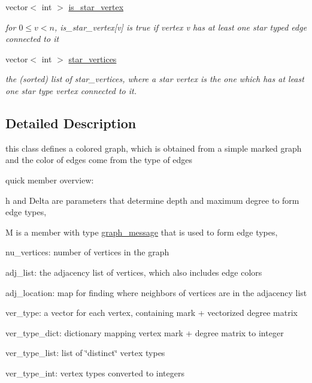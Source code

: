\begin{DoxyCompactItemize}
vector$<$ int $>$ \hyperlink{classcolored__graph_a00d0c64fcf8de58553aa4cade64193df}{is\+\_\+star\+\_\+vertex}
\begin{DoxyCompactList}\small\item\em for $0 \leq v < n$, is\+\_\+star\+\_\+vertex\mbox{[}v\mbox{]} is true if vertex v has at least one star typed edge connected to it \end{DoxyCompactList}\item 
vector$<$ int $>$ \hyperlink{classcolored__graph_ab7ee8d717abde7ad7467ef695038f574}{star\+\_\+vertices}
\begin{DoxyCompactList}\small\item\em the (sorted) list of star\+\_\+vertices, where a star vertex is the one which has at least one star type vertex connected to it. \end{DoxyCompactList}\end{DoxyCompactItemize}


\subsection{Detailed Description}
this class defines a colored graph, which is obtained from a simple marked graph and the color of edges come from the type of edges 

quick member overview\+:


\begin{DoxyItemize}
\item h and Delta are parameters that determine depth and maximum degree to form edge types,
\item M is a member with type \hyperlink{classgraph__message}{graph\+\_\+message} that is used to form edge types,
\item nu\+\_\+vertices\+: number of vertices in the graph
\item adj\+\_\+list\+: the adjacency list of vertices, which also includes edge colors
\item adj\+\_\+location\+: map for finding where neighbors of vertices are in the adjacency list
\item ver\+\_\+type\+: a vector for each vertex, containing mark + vectorized degree matrix
\item ver\+\_\+type\+\_\+dict\+: dictionary mapping vertex mark + degree matrix to integer
\item ver\+\_\+type\+\_\+list\+: list of \char`\"{}distinct\char`\"{} vertex types
\item ver\+\_\+type\+\_\+int\+: vertex types converted to integers
\end{DoxyItemize}

